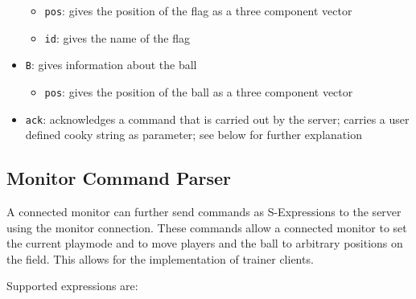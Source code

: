 \begin{itemize}
  \begin{itemize}
    
  \item \texttt{pos}: gives the position of the flag as a three
    component vector
    
  \item \texttt{id}: gives the name of the flag
    
  \end{itemize}
  
\item \texttt{B}: gives information about the ball 

  \begin{itemize}
    
  \item \texttt{pos}: gives the position of the ball as a three
    component vector
    
  \end{itemize}
  
\item \texttt{ack}: acknowledges a command that is carried out by the
  server; carries a user defined cooky string as parameter; see below
  for further explanation

\end{itemize}

\subsection{Monitor Command Parser}

A connected monitor can further send commands as S-Expressions to the
server using the monitor connection. These commands allow a connected
monitor to set the current playmode and to move players and the ball
to arbitrary positions on the field. This allows for the
implementation of trainer clients.

Supported expressions are:

